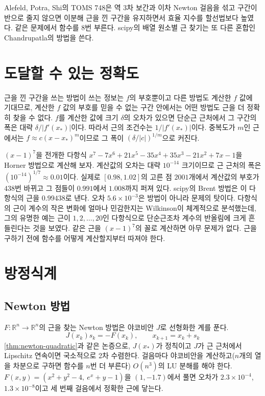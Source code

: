Alefeld, Potra, Shi의 TOMS 748은 역 3차 보간과 이차 Newton 걸음을 섞고 구간이 반으로 줄지 않으면 이분해 근을 낀 구간을 유지하면서 효율 지수를 할선법보다 높였다\cite{alefeld1995}. 같은 문제에서 함수를 $8$번 부른다. scipy의 배열 원소별 근 찾기는 또 다른 혼합인 Chandrupatla의 방법을 쓴다\cite{chandrupatla1997}.

\section{도달할 수 있는 정확도}
\label{sec:root-accuracy}

근을 낀 구간을 쓰는 방법이 쓰는 정보는 $f$의 부호뿐이고 다른 방법도 계산한 $f$ 값에 기대므로, 계산한 $f$ 값의 부호를 믿을 수 없는 구간 안에서는 어떤 방법도 근을 더 정확히 찾을 수 없다. $f$를 계산한 값에 크기 $\delta$의 오차가 있으면 단순근 근처에서 그 구간의 폭은 대략 $\delta/|f'(x_\ast)|$이다. 따라서 근의 조건수는 $1/|f'(x_\ast)|$이다. 중복도가 $m$인 근에서는 $f\approx c(x-x_\ast)^m$이므로 그 폭이 $(\delta/|c|)^{1/m}$으로 커진다.

$(x-1)^7$을 전개한 다항식 $x^7-7x^6+21x^5-35x^4+35x^3-21x^2+7x-1$을 Horner 방법으로 계산해 보자. 계산값의 오차는 대략 $10^{-14}$ 크기이므로 근 근처의 폭은 $(10^{-14})^{1/7}\approx0.01$이다. 실제로 $[0.98,1.02]$의 고른 점 $2001$개에서 계산값의 부호가 $438$번 바뀌고 그 점들이 $0.991$에서 $1.008$까지 퍼져 있다. scipy의 Brent 방법은 이 다항식의 근을 $0.99438$로 낸다. 오차 $5.6\times10^{-3}$은 방법이 아니라 문제의 탓이다. 다항식의 근이 계수의 작은 변화에 얼마나 민감한지는 Wilkinson이 체계적으로 분석했는데, 그의 유명한 예는 근이 $1,2,\dots,20$인 다항식으로 단순근조차 계수의 반올림에 크게 흔들린다는 것을 보였다\cite{wilkinson1959polynomials}. 같은 근을 $(x-1)^7$의 꼴로 계산하면 아무 문제가 없다. 근을 구하기 전에 함수를 어떻게 계산할지부터 따져야 한다.

\section{방정식계}
\label{sec:systems}

\subsection{Newton 방법}

$F:\mathbb R^n\to\mathbb R^n$의 근을 찾는 Newton 방법은 야코비안 $J$로 선형화한 계를 푼다.
\[
J(x_k)s_k=-F(x_k),\qquad x_{k+1}=x_k+s_k
\]
\cref{thm:newton-quadratic}과 같은 논증으로, $J(x_\ast)$가 정칙이고 $J$가 근 근처에서 Lipschitz 연속이면 국소적으로 2차 수렴한다\cite{ortega2000}. 걸음마다 야코비안을 계산하고($n$개의 열을 차분으로 구하면 함수를 $n$번 더 부른다) $O(n^3)$의 LU 분해를 해야 한다. $F(x,y)=(x^2+y^2-4,\ e^x+y-1)$을 $(1,-1.7)$에서 풀면 오차가 $2.3\times10^{-4}$, $1.3\times10^{-8}$이고 세 번째 걸음에서 정확한 근에 닿는다.

